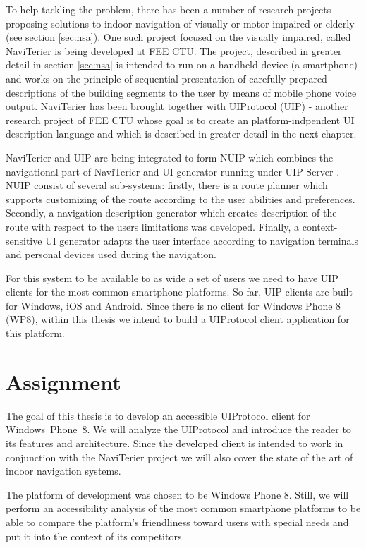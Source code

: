 To help tackling the problem, there has been a number of research projects proposing solutions to indoor navigation of visually or motor impaired or elderly (see section \ref{sec:nsa}). One such project focused on the visually impaired, called NaviTerier \cite{naviterier} is being developed at FEE CTU. The project, described in greater detail in section \ref{sec:nsa} is intended to run on a handheld device (a smartphone) and works on the principle of sequential presentation of carefully prepared descriptions of the building segments to the user by means of mobile phone voice output. NaviTerier has been brought together with UIProtocol (UIP) - another research project of FEE CTU whose goal is to create an platform-indpendent UI description language and which is described in greater detail in the next chapter.

NaviTerier and UIP are being integrated to form NUIP which combines the navigational part of NaviTerier and UI generator running under UIP Server \cite{balata}. NUIP consist of several sub-systems: firstly, there is a route planner which supports customizing of the route according to the user abilities and preferences. Secondly, a navigation description generator which creates description of the route with respect to the users limitations was developed. Finally, a context-sensitive UI generator \cite{macik2} adapts the user interface according to navigation terminals and personal devices used during the navigation.

For this system to be available to as wide a set of users we need to have UIP clients for the most common smartphone platforms. So far, UIP clients are built for Windows, iOS and Android. Since there is no client for Windows Phone 8 (WP8), within this thesis we intend to build a UIProtocol client application for this platform. 

\section{Assignment}
The goal of this thesis is to develop an accessible UIProtocol client for Windows~Phone~8. We will analyze the UIProtocol and introduce the reader to its features and architecture. Since the developed client is intended to work in conjunction with the NaviTerier project we will also cover the state of the art of indoor navigation systems.

The platform of development was chosen to be Windows Phone 8. Still, we will perform an accessibility analysis of the most common smartphone platforms to be able to compare the platform's friendliness toward users with special needs and put it into the context of its competitors.

